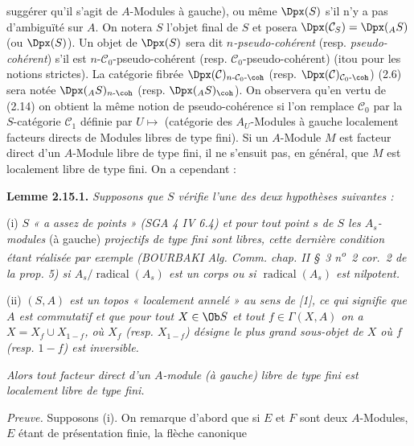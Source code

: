suggérer qu'il s'agit de \(A\)-Modules à gauche), ou même \(\Dpx(S)\) s'il n'y a pas d'ambiguïté sur \(A\). On notera \(S\) l'objet final de \(S\) et posera \(\Dpx(\mathcal C_S)=\Dpx({}_A S)\) (ou \(\Dpx(S)\)). Un objet de \(\Dpx(S)\) sera dit \emph{\(n\)-pseudo-cohérent} (resp. \emph{pseudo-cohérent}) s'il est \(n\)-\(\mathcal C_0\)-pseudo-cohérent (resp. \(\mathcal C_0\)-pseudo-cohérent) (itou pour les notions strictes). La catégorie fibrée \(\Dpx(\mathcal C)_{n\text{-}\mathcal C_0\text{-}\coh}\) (resp. \(\Dpx(\mathcal C)_{\mathcal C_0\text{-}\coh}\)) (2.6) sera notée \(\Dpx({}_A S)_{n\text{-}\coh}\) (resp. \(\Dpx({}_A S)_{\coh}\)). On observera qu'en vertu de (2.14) on obtient la même notion de pseudo-cohérence si l'on remplace \(\mathcal C_0\) par la \(S\)-catégorie \(\mathcal C_1\) définie par \(U\longmapsto\) (catégorie des \(A_U\)-Modules à gauche localement facteurs directs de Modules libres de type fini). Si un \(A\)-Module \(M\) est facteur direct d'un \(A\)-Module libre de type fini, il ne s'ensuit pas, en général, que \(M\) est localement libre de type fini. On a cependant :

\textbf{Lemme 2.15.1.} \emph{Supposons que \(S\) vérifie l'une des deux hypothèses suivantes :}

(i) \emph{\(S\) « a assez de points » (SGA 4 IV 6.4) et pour tout point \(s\) de \(S\) les \(A_s\)-modules} (à gauche) \emph{projectifs de type fini sont libres, cette dernière condition étant réalisée par exemple (BOURBAKI Alg. Comm. chap. II \S~3 n\textsuperscript{o}~2 cor.~2 de la prop. 5) si \(A_s/\operatorname{radical}(A_s)\) est un corps ou si \(\operatorname{radical}(A_s)\) est nilpotent.}

(ii) \emph{\((S,A)\) est un topos « localement annelé » au sens de [1], ce qui signifie que \(A\) est commutatif et que pour tout \(X\in\Ob S\) et tout \(f\in\Gamma(X,A)\) on a \(X=X_f\cup X_{1-f}\), où \(X_f\) (resp. \(X_{1-f}\)) désigne le plus grand sous-objet de \(X\) où \(f\) (resp. \(1-f\)) est inversible.}

\emph{Alors tout facteur direct d'un \(A\)-module (à gauche) libre de type fini est localement libre de type fini.}

\emph{Preuve.} Supposons (i). On remarque d'abord que si \(E\) et \(F\) sont deux \(A\)-Modules, \(E\) étant de présentation finie, la flèche canonique
